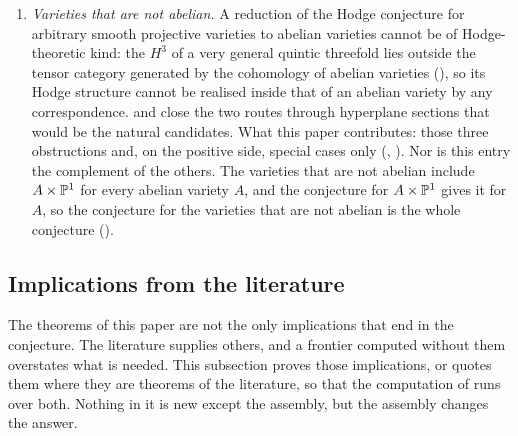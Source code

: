 \begin{enumerate}[label=\textup{(C\arabic*)},leftmargin=3.0em,itemsep=4pt]
  products of divisor classes nor Weil classes of any quotient
  (). So the Hodge conjecture for abelian varieties
  does not reduce to Weil classes, and the statement needed is the
  algebraicity of these classes themselves. What this paper contributes: the
  example, made exact, and the forms of their algebraicity studied in
  .
\item \emph{Varieties that are not abelian.} A reduction of the Hodge
  conjecture for arbitrary smooth projective varieties to abelian varieties
  cannot be of Hodge-theoretic kind: the $H^{3}$ of a very
  general quintic threefold lies outside the tensor category generated by the
  cohomology of abelian varieties (), so its Hodge
  structure cannot be realised inside that of an abelian variety by any
  correspondence.  and  close the
  two routes through hyperplane sections that would be the natural candidates.
  What this paper contributes: those three obstructions and, on the positive
  side, special cases only (,
  ). Nor is this entry the complement of the others. The varieties
  that are not abelian include $A\times\mathbb{P}^{1}$ for every abelian variety
  $A$, and the
  conjecture for $A\times\mathbb{P}^{1}$ gives it for $A$, so the conjecture for
  the varieties that are not abelian is the whole conjecture
  ().
\end{enumerate}

\subsection{Implications from the literature}\label{ssec:bullseye}

The theorems of this paper are not the only implications that end in the
conjecture. The literature supplies others, and a frontier computed without
them overstates what is needed. This subsection proves those implications, or
quotes them where they are theorems of the literature, so that the
computation of  runs over both. Nothing in it is new
except the assembly, but the assembly changes the answer.

